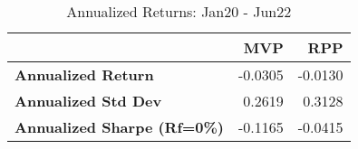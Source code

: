 \begin{table}[H]
      \centering
      \begingroup
      \fontsize{9}{9}
      \selectfont 
\begin{tabular}{>{}lrr}
\toprule
  & MVP & RPP\\
\midrule
\textbf{Annualized Return} & -0.0305 & -0.0130\\
\textbf{Annualized Std Dev} & 0.2619 & 0.3128\\
\textbf{Annualized Sharpe (Rf=0\%)} & -0.1165 & -0.0415\\
\bottomrule
\end{tabular} \caption{Annualized Returns: Jan20 - Jun22}
      \label{tab: HighLow2 }  
      \endgroup{}
      \end{table}
